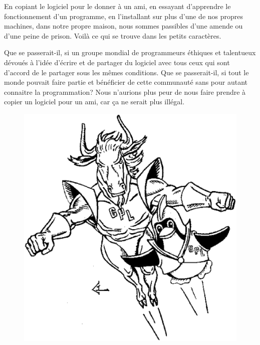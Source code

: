 \documentclass[twoside,12pt]{article}
\begin{document}
En copiant le logiciel pour le donner à un ami, en essayant d'apprendre le
fonctionnement d'un programme, en l'installant sur plus d'une de nos propres
machines, dans notre propre maison, nous sommes passibles d'une amende ou d'une
peine de prison. Voilà ce qui se trouve dans les petits caractères.


Que se passerait-il, si un groupe mondial de programmeurs éthiques et
talentueux dévoués à l'idée d'écrire et de partager du logiciel avec tous ceux
qui sont d'accord de le partager sous les mêmes conditions. Que se
passerait-il, si tout le monde pouvait faire partie et bénéficier de cette
communauté sans pour autant connaitre la programmation? Nous n'aurions plus
peur de nous faire prendre à copier un logiciel pour un ami, car ça ne serait
plus illégal.


\begin{figure}
 \begin{center}
   \includegraphics[scale=0.23]{dynamic-duo-bw.eps}
 \end{center}
\end{figure}
\end{document}
